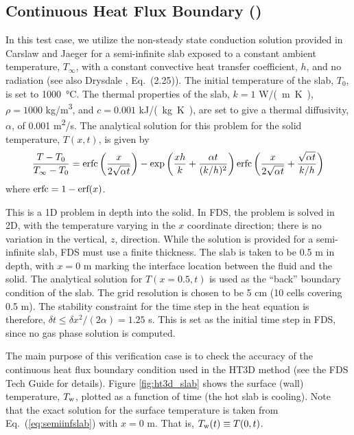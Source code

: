 \documentclass[11pt]{book}
\begin{document}
\subsection{Continuous Heat Flux Boundary (\texorpdfstring{}{ht3d\_slab})}
\label{ht3d_slab}

In this test case, we utilize the non-steady state conduction solution provided in Carslaw and Jaeger \cite{Carslaw:1} for a semi-infinite slab exposed to a constant ambient temperature, $T_\infty$, with a constant convective heat transfer coefficient, $h$, and no radiation (see also Drysdale \cite{Drysdale:1}, Eq.~(2.25)).  The initial temperature of the slab, $T_0$, is set to \SI{1000}{\degreeCelsius}. The thermal properties of the slab, $k=1$ \si{W/(m.K)}, $\rho=1000$ \si{kg/m^3}, and $c=0.001$ \si{kJ/(kg.K)}, are set to give a thermal diffusivity, $\alpha$, of 0.001 \si{m^2/s}. The analytical solution for this problem for the solid temperature, $T(x,t)$, is given by
\begin{equation}
\label{eq:semiinfslab}
\frac{T - T_0}{T_\infty - T_0} = \hbox{erfc}\left(\frac{x}{2\sqrt{\alpha t}}\right) - \exp\left( \frac{xh}{k} + \frac{\alpha t}{(k/h)^2} \right) \hbox{erfc}\left( \frac{x}{2\sqrt{\alpha t}} + \frac{\sqrt{\alpha t}}{k/h} \right)
\end{equation}
where $\hbox{erfc} = 1 - \hbox{erf}(x)$.

This is a 1D problem in depth into the solid.  In FDS, the problem is solved in 2D, with the temperature varying in the $x$ coordinate direction; there is no variation in the vertical, $z$, direction.  While the solution is provided for a semi-infinite slab, FDS must use a finite thickness.  The slab is taken to be 0.5 m in depth, with $x=0$ m marking the interface location between the fluid and the solid.  The analytical solution for $T(x=0.5,t)$ is used as the ``back'' boundary condition of the slab.  The grid resolution is chosen to be 5 cm (10 cells covering 0.5 m).  The stability constraint for the time step in the heat equation is therefore, $\delta t \le \delta x^2/(2\alpha) = 1.25$ s.  This is set as the initial time step in FDS, since no gas phase solution is computed.

The main purpose of this verification case is to check the accuracy of the continuous heat flux boundary condition used in the HT3D method (see the FDS Tech Guide \cite{FDS_Math_Guide} for details).  Figure \ref{fig:ht3d_slab} shows the surface (wall) temperature, $T_{\rm w}$, plotted as a function of time (the hot slab is cooling).  Note that the exact solution for the surface temperature is taken from Eq.~(\ref{eq:semiinfslab}) with $x=0$ m.  That is, $T_{\rm w}(t) \equiv T(0,t)$.
\end{document}
